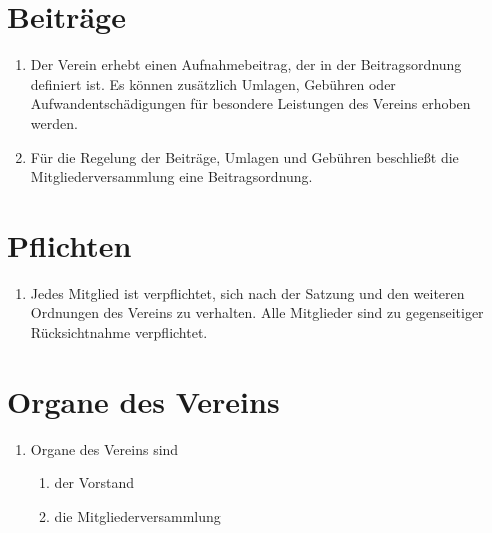 \documentclass[a4paper,ngerman]{scrartcl}
\begin{document}
\section{Beiträge}
\begin{enumerate}
\item Der Verein erhebt einen Aufnahmebeitrag, der in der Beitragsordnung definiert ist. Es können zusätzlich Umlagen, Gebühren oder Aufwandentschädigungen für besondere Leistungen des Vereins erhoben werden.
\item Für die Regelung der Beiträge, Umlagen und Gebühren beschließt die Mitgliederversammlung eine Beitragsordnung. \label{Beschluss einer Beitragsordnung}
\end{enumerate}

\section{Pflichten}
\begin{enumerate}
\item Jedes Mitglied ist verpflichtet, sich nach der Satzung und den weiteren Ordnungen des Vereins zu verhalten. Alle Mitglieder sind zu gegenseitiger Rücksichtnahme verpflichtet.
\end{enumerate}

\section{Organe des Vereins}
\begin{enumerate}
\item Organe des Vereins sind
\begin{enumerate}
\item der Vorstand
\item die Mitgliederversammlung
\end{enumerate}
\end{enumerate}
\end{document}
